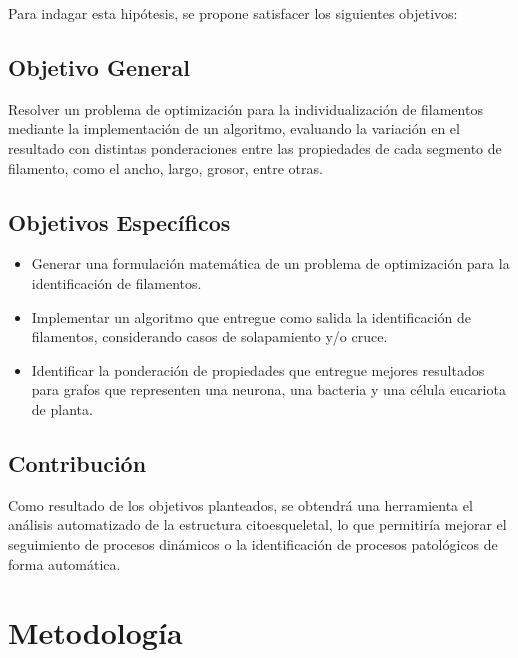 \documentclass{article}
\begin{document}

Para indagar esta hip\'otesis, se propone satisfacer los siguientes objetivos:
\subsection{Objetivo General}
Resolver un problema de optimizaci\'on para la individualizaci\'on de filamentos mediante la implementaci\'on de un algoritmo, evaluando la variaci\'on en el resultado con distintas ponderaciones entre las propiedades de cada segmento de filamento, como el ancho, largo, grosor, entre otras.

\subsection{Objetivos Espec\'ificos}
\begin{itemize}
    \item Generar una formulaci\'on matem\'atica de un problema de optimizaci\'on para la identificaci\'on de filamentos. 
    \item Implementar un algoritmo que entregue como salida la identificaci\'on de filamentos, considerando casos de solapamiento y/o cruce.
    \item Identificar la ponderaci\'on de propiedades que entregue mejores resultados para grafos que representen una neurona, una bacteria y una c\'elula eucariota de planta. 
    
\end{itemize}

\subsection{Contribuci\'on}

Como resultado de los objetivos planteados, se obtendr\'a una herramienta el an\'alisis automatizado de la estructura citoesqueletal, lo que permitir\'ia mejorar el seguimiento de procesos din\'amicos o la identificaci\'on de procesos patol\'ogicos de forma autom\'atica.

\section{Metodolog\'ia}
\end{document}
